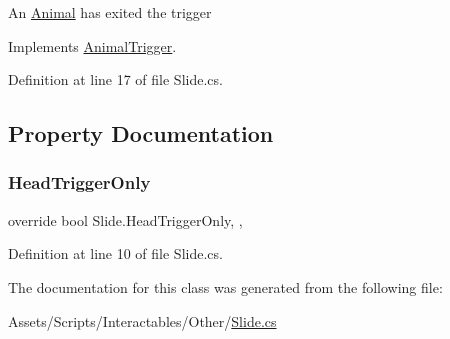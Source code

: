 An \mbox{\hyperlink{class_animal}{Animal}} has exited the trigger 



Implements \mbox{\hyperlink{class_animal_trigger_aa1a7c2e90de76c2e089b2bae01813f5c}{Animal\+Trigger}}.



Definition at line 17 of file Slide.\+cs.



\subsection{Property Documentation}
\mbox{\label{class_slide_a53257fd15de04d2f6a5c7c6a7ba38487}} 
\subsubsection{\texorpdfstring{Head\+Trigger\+Only}{HeadTriggerOnly}}
{\footnotesize\ttfamily override bool Slide.\+Head\+Trigger\+Only\hspace{0.3cm}{\ttfamily [get]}, {\ttfamily [set]}, {\ttfamily [protected]}}



Definition at line 10 of file Slide.\+cs.



The documentation for this class was generated from the following file\+:\begin{DoxyCompactItemize}
\item 
Assets/\+Scripts/\+Interactables/\+Other/\mbox{\hyperlink{_slide_8cs}{Slide.\+cs}}\end{DoxyCompactItemize}
